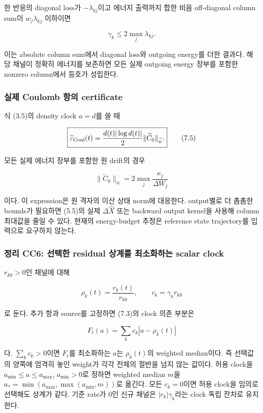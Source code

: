 \documentclass[11pt,a4paper]{article}
\begin{document}
한 반응의 diagonal loss가 \(-\lambda_{kj}\)이고 에너지 출력까지 합한 비음 off-diagonal column sum이 \(w_j\lambda_{kj}\) 이하이면

\[
\boxed{\gamma_k\le2\max_j\lambda_{kj}.}
\tag{7.4}
\]

이는 absolute column sum에서 diagonal loss와 outgoing energy를 더한 결과다. 해당 채널이 정확히 에너지를 보존하면 모든 실제 outgoing energy 장부를 포함한 nonzero column에서 등호가 성립한다.

\hypertarget{uxc2e4uxc81c-coulomb-uxd56duxc758-certificate}{%
\subsubsection{실제 Coulomb 항의 certificate}\label{uxc2e4uxc81c-coulomb-uxd56duxc758-certificate}}

식 (3.5)의 density clock \(a=d\)를 쓸 때

\[
\boxed{
\widetilde\varepsilon_{\rm Coul}(t)
=\frac{d(t)|\log d(t)|}{2}
\|\widetilde C_0\|_{\widetilde w}.
}
\tag{7.5}
\]

모든 실제 에너지 장부를 포함한 원 drift의 경우

\[
\|\widetilde C_0\|_{\widetilde w}
=2\max_j\frac{\kappa_j}{\Delta W_j}
\tag{7.6}
\]

이다. 이 expression은 원 격자의 이산 상태 norm에 대응한다. output별로 더 촘촘한 bounds가 필요하면 (5.5)의 실제 \(\Delta\widehat X\) 또는 backward output kernel을 사용해 column 최대값을 줄일 수 있다. 현재의 energy-budget 추정은 reference state trajectory를 입력으로 요구하지 않는다.

\hypertarget{uxc815uxb9ac-cc6-uxc120uxd0dduxd55c-residual-uxc0c1uxacc4uxb97c-uxcd5cuxc18cuxd654uxd558uxb294-scalar-clock}{%
\subsubsection{정리 CC6: 선택한 residual 상계를 최소화하는 scalar clock}\label{uxc815uxb9ac-cc6-uxc120uxd0dduxd55c-residual-uxc0c1uxacc4uxb97c-uxcd5cuxc18cuxd654uxd558uxb294-scalar-clock}}

\(r_{k0}>0\)인 채널에 대해

\[
\rho_k(t)=\frac{r_k(t)}{r_{k0}},\qquad
c_k=\gamma_k r_{k0}
\tag{7.7}
\]

로 둔다. 추가 항과 source를 고정하면 (7.3)의 clock 의존 부분은

\[
F_t(a)=\sum_k c_k|a-\rho_k(t)|
\tag{7.8}
\]

다. \(\sum_kc_k>0\)이면 \(F_t\)를 최소화하는 \(a\)는 \(\rho_k(t)\)의 weighted median이다. 즉 선택값의 양쪽에 엄격히 놓인 weight가 각각 전체의 절반을 넘지 않는 값이다. 허용 clock을 \(a_{\min}\le a\le a_{\max}\), \(a_{\min}>0\)로 정하면 weighted median \(m\)을 \(a_*=\min(a_{\max},\max(a_{\min},m))\)로 옮긴다. 모든 \(c_k=0\)이면 허용 clock을 임의로 선택해도 상계가 같다. 기준 rate가 0인 신규 채널은 \(|r_k|\gamma_k\)라는 clock 독립 잔차로 유지한다.
\end{document}
